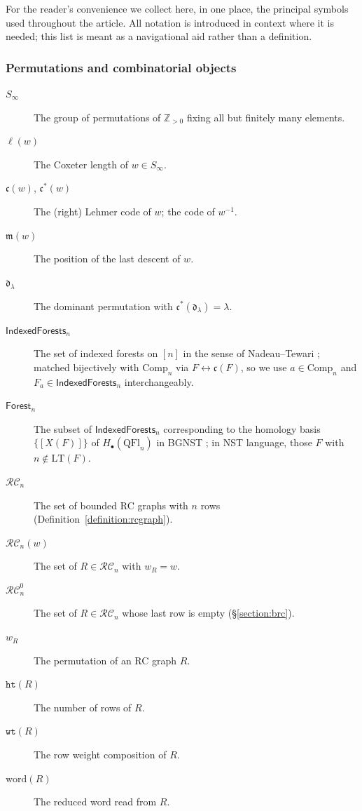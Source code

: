 \documentclass{amsart}
\theoremstyle{definition}
\theoremstyle{remark}
\numberwithin{equation}{subsection}
\newcommand{\wof}[1]{w_{#1}}
\newcommand{\wtt}{\mathtt{wt}}
\newcommand{\hr}{\mathtt{ht}}
\newcommand{\RC}{\mathcal{RC}}
\newcommand{\dom}{\mathfrak{d}}
\newcommand{\code}{\mathfrak{c}}
\newcommand{\maxd}{\mathfrak{m}}
\begin{document}
For the reader's convenience we collect here, in one place, the principal symbols used throughout the article. All notation is introduced in context where it is needed; this list is meant as a navigational aid rather than a definition.

\begingroup
{}

\subsubsection*{Permutations and combinatorial objects}
\begin{description}
\item[$S_\infty$] The group of permutations of $\mathbb{Z}_{>0}$ fixing all but finitely many elements.
\item[$\ell(w)$] The Coxeter length of $w\in S_\infty$.
\item[$\code(w)$, $\code^*(w)$] The (right) Lehmer code of $w$; the code of $w^{-1}$.
\item[$\maxd(w)$] The position of the last descent of $w$.
\item[$\dom_\lambda$] The dominant permutation with $\code^*(\dom_\lambda)=\lambda$.
\item[$\mathsf{IndexedForests}_n$] The set of indexed forests on $[n]$ in the sense of Nadeau--Tewari \cite{nadeau2024forest}; matched bijectively with $\mathrm{Comp}_n$ via $F\leftrightarrow\code(F)$, so we use $a\in\mathrm{Comp}_n$ and $F_a\in\mathsf{IndexedForests}_n$ interchangeably.
\item[$\mathsf{Forest}_n$] The subset of $\mathsf{IndexedForests}_n$ corresponding to the homology basis $\{[X(F)]\}$ of $H_\bullet(\mathrm{QFl}_n)$ in BGNST \cite[Cor.~11.6]{bergeron2025qsymflag}; in NST language, those $F$ with $n\notin\mathrm{LT}(F)$.
\item[$\RC_n$] The set of bounded RC graphs with $n$ rows (Definition~\ref{definition:rcgraph}).
\item[$\RC_n(w)$] The set of $R\in\RC_n$ with $\wof{R}=w$.
\item[$\RC_n^0$] The set of $R\in\RC_n$ whose last row is empty (\S\ref{section:brc}).
\item[$\wof{R}$] The permutation of an RC graph $R$.
\item[$\hr(R)$] The number of rows of $R$.
\item[$\wtt(R)$] The row weight composition of $R$.
\item[$\mathrm{word}(R)$] The reduced word read from $R$.
\end{description}
\end{document}
